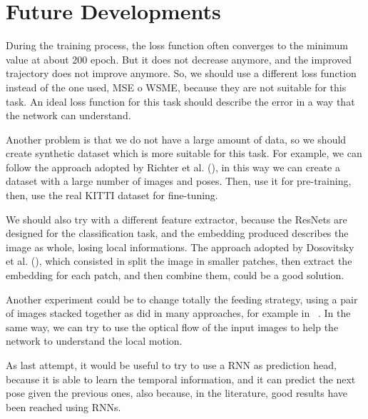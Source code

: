 \section{Future Developments}\label{sec:future-developments}

During the training process, the loss function often converges to the minimum value at about 200 epoch.
But it does not decrease anymore, and the improved trajectory does not improve anymore.
So, we should use a different loss function instead of the one used, MSE o WSME, because they are not suitable for this task.
An ideal loss function for this task should describe the error in a way that the network can understand.

Another problem is that we do not have a large amount of data, so we should create synthetic dataset which is more suitable for this task.
For example, we can follow the approach adopted by Richter et al. (\cite{synthetic_dataset}), in this way we can create a dataset with a large number of images and poses.
Then, use it for pre-training, then, use the real KITTI dataset for fine-tuning.

We should also try with a different feature extractor, because the ResNets are designed for the classification task, and the embedding produced describes the image as whole, losing local informations.
The approach adopted by Dosovitsky et al. (\cite{vit_paper}), which consisted in split the image in smaller patches, then extract the embedding for each patch, and then combine them, could be a good solution.

Another experiment could be to change totally the feeding strategy, using a pair of images stacked together as did in many approaches, for example in ~\cite{deep_vo}.
In the same way, we can try to use the optical flow of the input images to help the network to understand the local motion.

As last attempt, it would be useful to try to use a RNN as prediction head, because it is able to learn the temporal information, and it can predict the next pose given the previous ones, also because, in the literature, good results have been reached using RNNs.